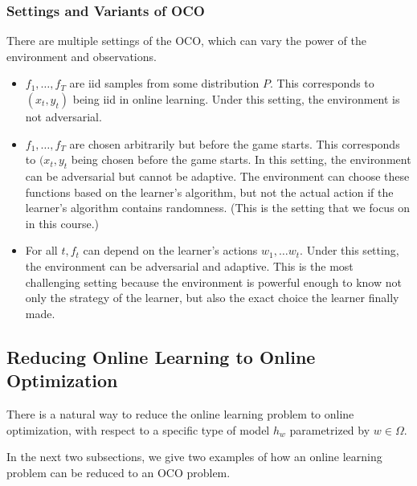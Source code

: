 \documentclass{article}
\begin{document}
\subsubsection{ Settings and Variants of OCO}
There are multiple settings of the OCO, which can vary the power of the environment and observations.
\begin{itemize}
    \item {} $f_{1}, \ldots, f_{T}$ are \gls{iid} samples from some distribution $P$. This corresponds to $\left(x_{t}, y_{t}\right)$ being \gls{iid} in online learning. Under this setting, the environment is not adversarial.
    \item {} $f_{1}, \ldots, f_{T}$ are chosen arbitrarily but before the game starts. This corresponds to $(x_{t}, y_{t}$ being chosen before the game starts. In this setting, the environment can be adversarial but  cannot be adaptive. The environment can choose these functions based on the learner's algorithm, but not the actual action if the learner's algorithm contains randomness. (This is the setting that we focus on in this course.)
    \item {} For all $t, f_{t}$ can depend on the learner's actions $w_{1}, \ldots w_{t}$. Under this setting, the environment can be adversarial and adaptive. This is the most challenging setting because the environment is powerful enough to know not only the strategy of the learner, but also the exact choice the learner finally made.
\end{itemize}
\subsection{Reducing Online Learning to Online Optimization}
There is a natural way to reduce the online learning problem to online optimization, with respect to a specific type of model $h_{w}$ parametrized by $w \in \Omega$.


\noindent{}


In the next two subsections, we give two examples of how an online learning problem can be reduced to an OCO problem.
\end{document}
